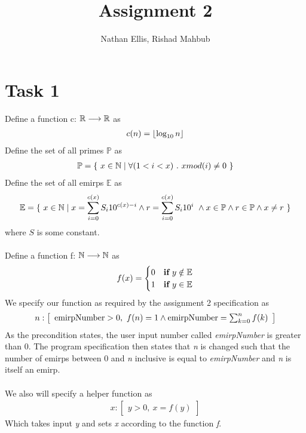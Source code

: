 \documentclass[headings=small,a4paper,12pt]{scrartcl}
\title{Assignment 2}
\author{Nathan Ellis, Rishad Mahbub}
\newcommand{\emirp}{\mathbb{E}}
\newcommand{\primeset}{\mathbb{P}}
\newcommand{\emirpNumber}{\text{emirpNumber}}
\begin{document}
\maketitle

\section{Task 1}
\label{sec:task-1}

Define a function c: $\mathbb{R}\longrightarrow\mathbb{R}$ as
\begin{align*}
  c(n) = \left\lfloor \log_{10}n \right\rfloor
\end{align*}
Define the set of all primes $\primeset$ as
\begin{align*}
  \primeset = \{\ x \in \nat \mid \forall{(1<i<x)}\ . \ {xmod(i)\neq0}\ \}
\end{align*}
Define the set of all emirps $\emirp$ as
\begin{align*}
  \emirp = \{\ x \in \nat \mid x = \sum_{i=0}^{c(x)} S_{i}10^{c(x)-i}\And r = \sum_{i=0}^{c(x)} S_{i}10^{i}\ \And x \in \primeset \And r \in \primeset \And x \neq r\ \}
\end{align*}
where $S$ is some constant. \\\\
Define a function f: $\mathbb{N}\longrightarrow\mathbb{N}$ as
\begin{gather*}
  f(x) =
  \begin{cases}
      0 & \IF\ y\notin\emirp\\
      1 & \IF\ y\in\emirp
  \end{cases}
\end{gather*}
We specify our function as required by the assignment 2 specification as
\begin{gather*}
    {n:\left[
    \begin{array}{l}
      \emirpNumber > 0,\ f(n)=1 \And \emirpNumber = \sum_{k=0}^{n} f(k)
    \end{array}
  \right]}
\end{gather*}
As the precondition states, the user input number called \textit{emirpNumber} is greater than 0.
The program specification then states that \textit{n} is changed such that the number of emirps between 0 and \textit{n} inclusive is equal to \textit{emirpNumber} and \textit{n} is itself an emirp.
\\\\
We also will specify a helper function as
\begin{gather*}
    {x:\left[
    \begin{array}{l}
      y > 0,\ x = f(y)
    \end{array}
  \right]}
\end{gather*}
Which takes input \textit{y} and sets \textit{x} according to the function \textit{f}.
\pagebreak
\end{document}
